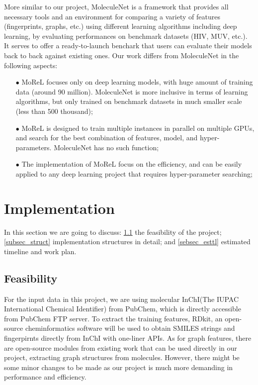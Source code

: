\documentclass[conference]{IEEEtran}
\begin{document}
More similar to our project, MoleculeNet \cite{molnet} is a framework that provides all necessary tools and an environment for comparing a variety of features (fingerprints, graphs, etc.) using different learning algorithms including deep learning, by evaluating performances on benchmark datasets (HIV, MUV, etc.). 
It serves to offer a ready-to-launch benchark that users can evaluate their models back to back against existing ones. 
Our work differs from MoleculeNet in the following aspects:
\begin{itemize}
	\item[$\bullet$]  MoReL focuses only on deep learning models, with huge amount of training data (around 90 million). MoleculeNet is more inclusive in terms of learning algorithms, but only trained on benchmark datasets in much smaller scale (less than 500 thousand);
	\item[$\bullet$]  MoReL is designed to train multiple instances in parallel on multiple GPUs, and search for the best combination of features, model, and hyper-parameters. MoleculeNet has no such function;
	\item[$\bullet$]  The implementation of MoReL focus on the efficiency, and can be easily applied to any deep learning project that requires hyper-parameter searching; 
\end{itemize}

\section{Implementation} \label{sec_impl} 

In this section we are going to discuss: \ref{subsec_feas} the feasibility of the project; \ref{subsec_struct} implementation structures in detail; and \ref{sebsec_esttl} estimated timeline and work plan. 

\subsection{Feasibility} \label{subsec_feas} 

For the input data in this project, we are using molecular InChI(The IUPAC International Chemical Identifier) from PubChem, which is directly accessible from PubChem FTP server. 
To extract the training features, RDkit, an open-source cheminformatics software will be used to obtain SMILES strings and fingerpirnts directly from InChI with one-liner APIs. 
As for graph features, there are open-source modules from existing work \cite{gcn_fp} that can be used directly in our project, extracting graph structures from molecules. 
However, there might be some minor changes to be made as our project is much more demanding in performance and efficiency. 
\end{document}
